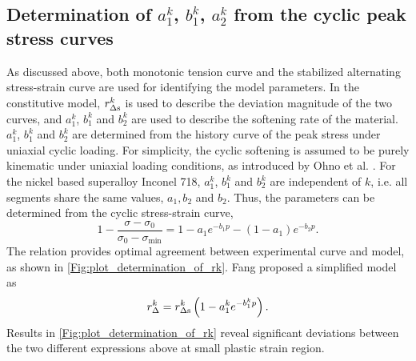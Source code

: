\subsection{Determination of $a_{1}^k$, $b_{1}^k$, $a_{2}^k$ from the cyclic peak stress curves}
\noindent
As discussed above, both monotonic tension curve and the stabilized alternating stress-strain curve are used for identifying the model parameters.
In the constitutive model, $r_{\Delta \rm{s}}^k$ is used to describe the deviation magnitude of the two curves, and $a_{1}^k$, $b_{1}^k$ and $b_{2}^k$ are used to describe the softening rate of the material.
$a_{1}^k$, $b_{1}^k$ and $b_{2}^k$ are determined from the history curve of the peak stress under uniaxial cyclic loading. For simplicity, the cyclic softening is assumed to be purely kinematic under uniaxial loading conditions, as introduced by Ohno et al. \cite{Ohno1993375}.
For the nickel based superalloy Inconel 718, $a_{1}^k$, $b_{1}^k$ and $b_{2}^k$ are independent of $k$, i.e. all segments share the same values, $a_1, b_2$ and $b_2$.
Thus, the parameters can be determined from the cyclic stress-strain curve,
\begin{equation}
1 - \frac{{\sigma  - {\sigma _0}}}{{{\sigma _0} - {\sigma _{\min }}}} = 1 - a_1{e^{ - b_1 p}} - \left( {1 - a_1} \right){e^{ - b_2 p}}.
\end{equation}
The relation provides optimal agreement between experimental curve and model, as shown in \ref{Fig:plot_determination_of_rk}. Fang \cite{fang2015cyclic} proposed a simplified model as
\begin{equation}
r_\Delta ^k = r_{\Delta \rm{s}}^k\left( 1 - a_1^k{e^{ - b_1^kp}}\right).
\label{Equ:fangrdeltak}
\end{equation}
Results in \ref{Fig:plot_determination_of_rk} reveal significant deviations between the two different expressions above at small plastic strain region.

